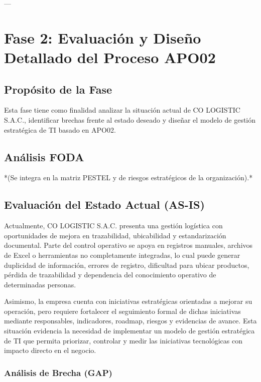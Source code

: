 \documentclass[11pt]{article}
\begin{document}
---

\section{Fase 2: Evaluación y Diseño Detallado del Proceso APO02}

\subsection{Propósito de la Fase}
Esta fase tiene como finalidad analizar la situación actual de CO LOGISTIC S.A.C., identificar brechas frente al estado deseado y diseñar el modelo de gestión estratégica de TI basado en APO02.

\subsection{Análisis FODA}
*(Se integra en la matriz PESTEL y de riesgos estratégicos de la organización).*

\subsection{Evaluación del Estado Actual (AS-IS)}
Actualmente, CO LOGISTIC S.A.C. presenta una gestión logística con oportunidades de mejora en trazabilidad, ubicabilidad y estandarización documental. Parte del control operativo se apoya en registros manuales, archivos de Excel o herramientas no completamente integradas, lo cual puede generar duplicidad de información, errores de registro, dificultad para ubicar productos, pérdida de trazabilidad y dependencia del conocimiento operativo de determinadas personas.

Asimismo, la empresa cuenta con iniciativas estratégicas orientadas a mejorar su operación, pero requiere fortalecer el seguimiento formal de dichas iniciativas mediante responsables, indicadores, roadmap, riesgos y evidencias de avance. Esta situación evidencia la necesidad de implementar un modelo de gestión estratégica de TI que permita priorizar, controlar y medir las iniciativas tecnológicas con impacto directo en el negocio.

\subsubsection{Análisis de Brecha (GAP)}
\end{document}
